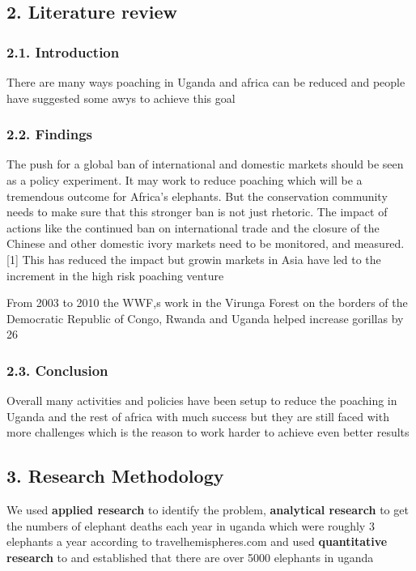 \documentclass[12pt]{article}
\begin{document}
\subsection*{2. Literature review}
\subsubsection*{2.1. Introduction}
There are many ways poaching in Uganda and africa can be reduced and people have suggested some awys to achieve this goal

\subsubsection*{2.2. Findings}
The push for a global ban of international and domestic markets should be seen as a policy experiment. It may work to reduce poaching which will be a tremendous outcome for Africa’s elephants. But the conservation community needs to make sure that this stronger ban is not just rhetoric. The impact of actions like the continued ban on international trade and the closure of the Chinese and other domestic ivory markets need to be monitored, and measured.[1] This has reduced the impact but growin markets in Asia have led to the increment in the high risk poaching venture

From 2003 to 2010 the WWF,s work in the Virunga Forest on the borders of the Democratic Republic of Congo, Rwanda and Uganda helped increase gorillas by 26%

\subsubsection*{2.3. Conclusion}
Overall many activities and policies have been setup to reduce the poaching in Uganda and the rest of africa with much success but they are still faced with more challenges which is the reason to work harder to achieve even better results

\subsection *{3. Research Methodology}

We used\textbf{ applied research} to identify the problem, \textbf{analytical research} to get the 
numbers of elephant deaths each year in
uganda which were roughly 3 elephants a year according 
to travelhemispheres.com and used \textbf{quantitative research} to and 
established that there are over 5000 
elephants in uganda
\end{document}

